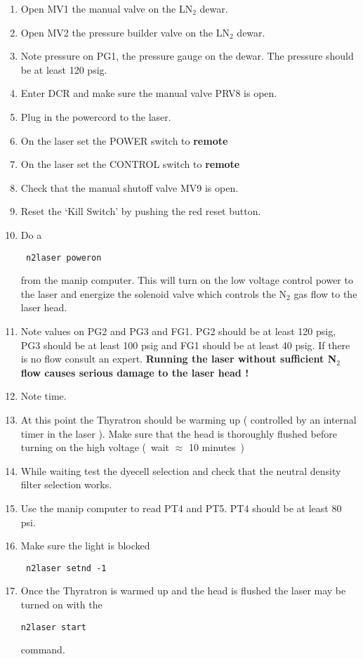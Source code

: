\begin{enumerate}
\item Open MV1 the manual valve on the LN$_2$ dewar.
\item Open MV2 the pressure builder valve on the LN$_2$ dewar.
\item Note pressure on PG1, the pressure gauge on the dewar.
      The pressure should be at least 120 psig.
\item Enter DCR and make sure the manual valve PRV8 is open.
\item Plug in the powercord to the laser.
\item On the laser set the POWER switch to {\bf remote}
\item On the laser set the CONTROL switch to {\bf remote}
\item Check that the manual shutoff valve MV9 is open.
\item Reset the `Kill Switch' by pushing the red reset button.
\item Do a 
 \begin{verbatim}
 n2laser poweron
 \end{verbatim}
from the manip computer. This will turn on
the low voltage control power to the laser and energize the solenoid valve
which controls  the N$_2$ gas flow to the laser head.
\item Note values on PG2 and PG3 and FG1.
  PG2 should be at least 120 psig, PG3 should be at least 100 psig and
  FG1 should be at least 40 psig.
If there is no flow consult an expert. {\bf Running the laser without sufficient N$_2$ flow
causes serious damage to the laser head !}


\item Note time.
\item At this point the Thyratron should be warming up ( controlled by an
internal timer in the laser ). Make sure that the head is thoroughly flushed
before turning on the high voltage (~wait $\approx$ 10 minutes~)
\item While waiting test the dyecell selection and check that the neutral density filter selection works.
\item Use the manip computer to read PT4 and PT5.
  PT4 should be at least 80 psi.
\item Make sure the light is blocked
\begin{verbatim}
 n2laser setnd -1
\end{verbatim}
\item Once the Thyratron is warmed up and the head is flushed 
the laser may be turned on with the 
\begin{verbatim}
n2laser start
\end{verbatim}
command.
\end{enumerate}

